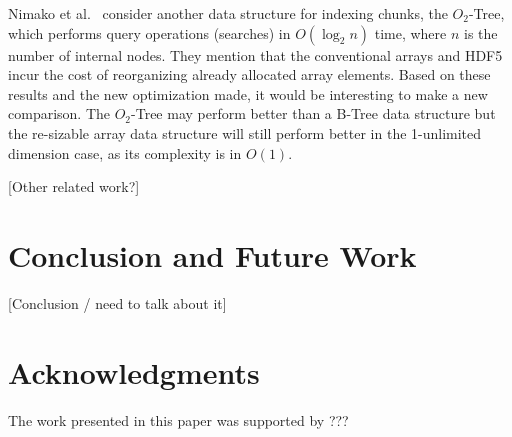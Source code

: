Nimako et al.~\cite{Nimako2012} consider another data structure for indexing
chunks, the $O_{2}$-Tree, which performs query operations (searches) in
$O(\log_{2}{n})$ time, where $n$ is the number of internal nodes. They
mention that the conventional arrays and HDF5 incur the cost
of reorganizing  already allocated array elements.
Based on these results and the new optimization made, it would be
interesting to make a new comparison. The $O_{2}$-Tree may perform
better than a B-Tree data structure but the re-sizable array data structure
will still perform better in the 1-unlimited dimension case, as its complexity
is in $O(1)$.

[Other related work?]

\section{Conclusion and Future Work}
\label{sec:conclusion}

[Conclusion / need to talk about it]

\section*{Acknowledgments}
The work presented in this paper was supported by ???

